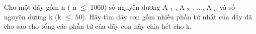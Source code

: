 Cho một dãy gồm n ( n  $\le$  1000) số nguyên dương A   $_    1   $   , A   $_    2   $   , ..., A   $_    n   $   và số nguyên dương k (k  $\le$  50). Hãy tìm dãy con gồm nhiều phần tử nhất của dãy đã cho sao cho tổng các phần tử của dãy con này chia hết cho k.